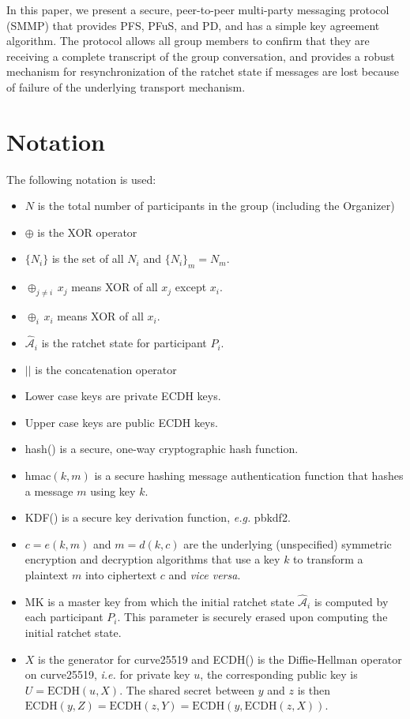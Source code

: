 \documentclass[%
preprint,
amsmath,amssymb,
aps,
prb,
floatfix,
]{revtex4-1}
\begin{document}
In this paper, we present a secure, peer-to-peer multi-party messaging protocol
(SMMP) that provides PFS, PFuS, and PD, and has a simple key agreement
algorithm. The protocol allows all group members to confirm that they are
receiving a complete transcript of the group conversation, and provides a
robust mechanism for resynchronization of the ratchet state if messages are lost
because of failure of the underlying transport mechanism.

\section{\label{sec:notation}Notation}
The following notation is used:
\begin{itemize}
\item $N$ is the total number of participants in the group (including the
Organizer)
\item $\oplus$ is the XOR operator
\item $\{N_i\}$ is the set of all $N_i$ and $\{N_i\}_m = N_m$.
\item $\oplus_{j \ne i} \, x_j$ means XOR of all $x_j$ except $x_i$.
\item  $\oplus_i \, x_i$ means XOR of all $x_i$.
\item $\mathcal{\hat{A}}_i$ is the ratchet state for
participant $P_i$.
\item $||$ is the concatenation operator
\item Lower case keys are private ECDH keys.
\item Upper case keys are public ECDH keys.
\item hash() is a secure, one-way cryptographic hash function.
\item hmac$(k,m)$ is a secure hashing message authentication function that
hashes a message $m$ using key $k$.
\item KDF() is a secure key derivation function, \textit{e.g.} pbkdf2.
\item $c = e(k, m)$ and $m = d(k,c)$ are the underlying (unspecified) symmetric
encryption and decryption algorithms that use a key $k$ to transform a plaintext
$m$ into ciphertext $c$ and \textit{vice versa}.
\item MK is a master key from which the initial ratchet state
$\mathcal{\hat{A}}_i$ is computed by each participant $P_i$. This parameter is
securely erased upon computing the initial ratchet state.
\item $X$ is the generator for curve25519 and ECDH() is the Diffie-Hellman
operator on curve25519, \textit{i.e.} for private key $u$, the
corresponding public key is $U = \mathrm{ECDH}(u, X)$. The shared secret between
$y$ and $z$ is then $ \mathrm{ECDH}(y,Z) = \mathrm{ECDH}(z,Y) =
\mathrm{ECDH}(y,\mathrm{ECDH}(z, X))$.
\end{itemize}
\end{document}
